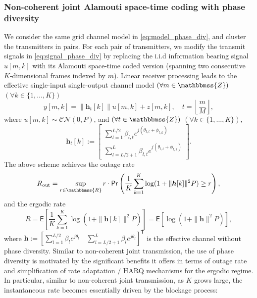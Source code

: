 \documentclass[10pt,journal,a4paper]{IEEEtran}
\newcommand{\eqdef}{:=}
\newcommand{\E}{\mathsf{E}}		%
\renewcommand{\P}{\mathsf{Pr}} 			%
\newcommand{\stdset}[1]{\mathbbmss{#1}}	%
\renewcommand{\vec}[1]{\bm{#1}}		%
\newcommand{\CN}{\mathcal{CN}}			%
\newcommand{\T}{\mathsf{T}}				%
\begin{document}
\subsubsection{Non-coherent joint Alamouti space-time coding with phase diversity}
We consider the same grid channel model in \eqref{eq:model_phase_div}, and cluster the transmitters in pairs. For each pair of transmitters, we modify the transmit signals in \eqref{eq:signal_phase_div} by replacing the i.i.d information bearing signal $u[m,k]$ with its Alamouti space-time coded version (spanning two consecutive $K$-dimensional frames indexed by $m$). Linear receiver processing leads to the effective single-input single-output channel model $(\forall m \in \stdset{Z})$ $(\forall k\in \{1,\ldots,K\})$
\begin{equation*}
y[m,k] = \|\vec{h}_t[k]\|u[m,k] + z[m,k], \quad t=\left\lfloor \frac{m}{M}\right\rfloor,
\end{equation*}
where $u[m,k]\sim \CN(0,P)$, and $(\forall t\in \stdset{Z})$ $(\forall k\in \{1,\ldots,K\})$,
\begin{equation*}
\vec{h}_t[k]\eqdef \begin{bmatrix}
\sum_{l=1}^{L/2}\beta_{l,t}e^{j(\theta_{l,t}+\phi_{l,k})}\\
\sum_{l=L/2+1}^{L}\beta_{l,t}e^{j(\theta_{l,t}+\phi_{l,k})}
\end{bmatrix}.
\end{equation*}
The above scheme achieves the outage rate 
\begin{equation*}
R_{\mathrm{out}} = \sup_{r\in \stdset{R}} r\cdot \P\left(\dfrac{1}{K}\sum_{k=1}^K\log(1+\|\vec{h}[k]\|^2P) \geq r\right),
\end{equation*}
and the ergodic rate
\begin{equation*}
R = \E\left[\dfrac{1}{K}\sum_{k=1}^K\log(1+\|\vec{h}[k]\|^2P)\right]=\E[\log(1+\|\vec{h}\|^2P)],
\end{equation*}
where $\vec{h} \eqdef [
\sum_{l=1}^{L/2}\beta_l e^{j\theta_l}\quad 
\sum_{l=L/2+1}^{L}\beta_le^{j\theta_l}]^\T$ is the effective channel without phase diversity. Similar to non-coherent joint transmission, the use of phase diversity is motivated by the significant benefits it offers in terms of outage rate and simplification of rate adaptation / HARQ mechanisms for the ergodic regime. In particular, similar to non-coherent joint transmission, as $K$ grows large, the instantaneous rate becomes essentially driven by the blockage process: 
\end{document}
